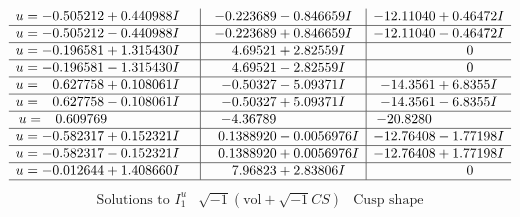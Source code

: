 \documentclass[1p]{elsarticle_modified}
\theoremstyle{definition}
\newcommand{\I}{\sqrt{-1}}
\begin{document}
$$\begin{array}{c|c|c}
\begin{aligned}
u &= -0.505212 + 0.440988 I\end{aligned}
 & -0.223689 - 0.846659 I & -12.11040 + 0.46472 I \\ \hline\begin{aligned}
u &= -0.505212 - 0.440988 I\end{aligned}
 & -0.223689 + 0.846659 I & -12.11040 - 0.46472 I \\ \hline\begin{aligned}
u &= -0.196581 + 1.315430 I\end{aligned}
 & \phantom{-}4.69521 + 2.82559 I & \phantom{-0.000000 } 0 \\ \hline\begin{aligned}
u &= -0.196581 - 1.315430 I\end{aligned}
 & \phantom{-}4.69521 - 2.82559 I & \phantom{-0.000000 } 0 \\ \hline\begin{aligned}
u &= \phantom{-}0.627758 + 0.108061 I\end{aligned}
 & -0.50327 - 5.09371 I & -14.3561 + 6.8355 I \\ \hline\begin{aligned}
u &= \phantom{-}0.627758 - 0.108061 I\end{aligned}
 & -0.50327 + 5.09371 I & -14.3561 - 6.8355 I \\ \hline\begin{aligned}
u &= \phantom{-}0.609769\phantom{ +0.000000I}\end{aligned}
 & -4.36789\phantom{ +0.000000I} & -20.8280\phantom{ +0.000000I} \\ \hline\begin{aligned}
u &= -0.582317 + 0.152321 I\end{aligned}
 & \phantom{-}0.1388920 - 0.0056976 I & -12.76408 - 1.77198 I \\ \hline\begin{aligned}
u &= -0.582317 - 0.152321 I\end{aligned}
 & \phantom{-}0.1388920 + 0.0056976 I & -12.76408 + 1.77198 I \\ \hline\begin{aligned}
u &= -0.012644 + 1.408660 I\end{aligned}
 & \phantom{-}7.96823 + 2.83806 I & \phantom{-0.000000 } 0\\
 \hline 
 \end{array}$$\newpage$$\begin{array}{c|c|c}  
\text{Solutions to }I^u_{1}& \I (\text{vol} + \sqrt{-1}CS) & \text{Cusp shape}\\

\end{array}$$
\end{document}
